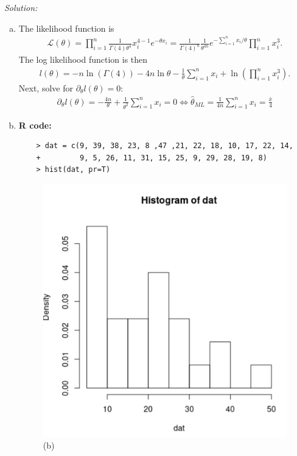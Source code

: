 \documentclass{book}
\theoremstyle{definition}
\newcommand{\p}{\partial}
\newcommand{\lag}{\mathcal{L}}
\newcommand{\f}[2]{\frac{#1}{#2}}
\newcommand{\lp}{\left(}
\newcommand{\rp}{\right)}
\begin{document}
\noindent \textit{Solution:} 
\begin{enumerate}[(a)]
	\item The likelihood function is 
	\begin{align}
	\lag(\theta) = \prod^n_{i=1} \f{1}{\Gamma(4) \theta^{4}} x_i^{4-1}e^{-\theta x_i} = \f{1}{\Gamma(4)^n} \f{1}{\theta^{4n}} e^{- \sum^n_{i=1} x_i/\theta} \prod^n_{i=1} x_i^3.
	\end{align}
	The log likelihood function is then 
	\begin{align}
	l(\theta) = -n \ln (\Gamma(4)) -4n \ln \theta -\f{1}{\theta} \sum^n_{i=1}x_i + \ln \lp \prod^n_{i=1}x_i^3 \rp.
	\end{align}
	Next, solve for $\p_\theta l(\theta) = 0$:
	\begin{align}
	\p_\theta l(\theta) = -\f{4n}{\theta} + \f{1}{\theta^2} \sum^n_{i=1}x_i = 0 \iff \boxed{\hat{\theta}_{ML} = \f{1}{4n}\sum^n_{i=1}x_i = \f{\bar{x}}{4}}
	\end{align}
	
	\item 
	\textbf{R code:}
	\begin{lstlisting}
	> dat = c(9, 39, 38, 23, 8 ,47 ,21, 22, 18, 10, 17, 22, 14, 
	+         9, 5, 26, 11, 31, 15, 25, 9, 29, 28, 19, 8)
	> hist(dat, pr=T)
	\end{lstlisting}
	\begin{figure}[!htb]
		\centering
		\includegraphics[scale=0.2]{dat611}
		\caption{(b)}
	\end{figure}
	

\end{enumerate}
\end{document}
